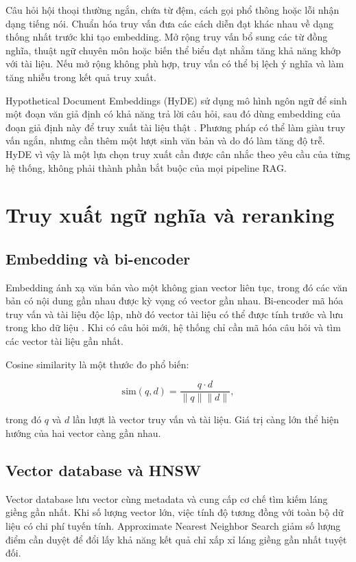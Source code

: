 \documentclass[a4paper,13pt,oneside]{report}
\begin{document}
Câu hỏi hội thoại thường ngắn, chứa từ đệm, cách gọi phổ thông hoặc lỗi nhận dạng tiếng nói. Chuẩn hóa truy vấn đưa các cách diễn đạt khác nhau về dạng thống nhất trước khi tạo embedding. Mở rộng truy vấn bổ sung các từ đồng nghĩa, thuật ngữ chuyên môn hoặc biến thể biểu đạt nhằm tăng khả năng khớp với tài liệu. Nếu mở rộng không phù hợp, truy vấn có thể bị lệch ý nghĩa và làm tăng nhiễu trong kết quả truy xuất.

Hypothetical Document Embeddings (HyDE) sử dụng mô hình ngôn ngữ để sinh một đoạn văn giả định có khả năng trả lời câu hỏi, sau đó dùng embedding của đoạn giả định này để truy xuất tài liệu thật \cite{hyde}. Phương pháp có thể làm giàu truy vấn ngắn, nhưng cần thêm một lượt sinh văn bản và do đó làm tăng độ trễ. HyDE vì vậy là một lựa chọn truy xuất cần được cân nhắc theo yêu cầu của từng hệ thống, không phải thành phần bắt buộc của mọi pipeline RAG.

\section{Truy xuất ngữ nghĩa và reranking}

\subsection{Embedding và bi-encoder}

Embedding ánh xạ văn bản vào một không gian vector liên tục, trong đó các văn bản có nội dung gần nhau được kỳ vọng có vector gần nhau. Bi-encoder mã hóa truy vấn và tài liệu độc lập, nhờ đó vector tài liệu có thể được tính trước và lưu trong kho dữ liệu \cite{sbert}. Khi có câu hỏi mới, hệ thống chỉ cần mã hóa câu hỏi và tìm các vector tài liệu gần nhất.

Cosine similarity là một thước đo phổ biến:

\begin{equation}
    \mathrm{sim}(q,d)
    =
    \frac{q \cdot d}{\lVert q\rVert\lVert d\rVert},
\end{equation}

trong đó \(q\) và \(d\) lần lượt là vector truy vấn và tài liệu. Giá trị càng lớn thể hiện hướng của hai vector càng gần nhau.

\subsection{Vector database và HNSW}

Vector database lưu vector cùng metadata và cung cấp cơ chế tìm kiếm láng giềng gần nhất. Khi số lượng vector lớn, việc tính độ tương đồng với toàn bộ dữ liệu có chi phí tuyến tính. Approximate Nearest Neighbor Search giảm số lượng điểm cần duyệt để đổi lấy khả năng kết quả chỉ xấp xỉ láng giềng gần nhất tuyệt đối.
\end{document}
